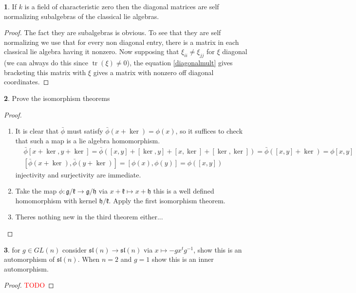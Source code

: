 \documentclass[10.5pt]{article}
\theoremstyle{definition}
\newtheorem{pb}{}
\numberwithin{example}{subsection}
\numberwithin{proposition}{subsection}
\numberwithin{pb}{subsection}
\begin{document}
        \begin{pb}
            If \(k\) is a field of characteristic zero then the diagonal matrices are self normalizing subalgebras of the classical lie algebras.

            \begin{proof}
                The fact they are subalgebras is obvious. To see that they are self normalizing we use that for every non diagonal entry, there is a matrix in each classical lie algebra having it nonzero. Now supposing that \(\xi_{ii} \neq \xi_{jj}\) for \(\xi\) diagonal (we can always do this since \(\operatorname{tr}(\xi) \neq 0\)), the equation \eqref{diagonalmult} gives bracketing this matrix with \(\xi\) gives a matrix with nonzero off diagonal coordinates.
            \end{proof}
        \end{pb}
        \begin{pb}
            Prove the isomorphism theorems
            \begin{proof}
                \begin{enumerate}
                    \item It is clear that \(\bar{\phi}\) must satisfy \(\bar{\phi}(x + \ker) = \phi(x)\), so it suffices to check that such a map is a lie algebra homomorphism.
                    \begin{align}
                        &\bar{\phi}[x+\ker,y+\ker] = \bar{\phi}([x,y] + [\ker,y] + [x,\ker] + [\ker,\ker]) = \bar{\phi}([x,y] + \ker) = \phi[x,y] \\
                        &[\bar{\phi}(x + \ker),\bar{\phi}(y + \ker)] = [\phi(x),\phi(y)] = \phi([x,y])
                    \end{align}
                    injectivity and surjectivity are immediate.

                    \item Take the map \(\phi: \mathfrak{g}/\mathfrak{k} \to \mathfrak{g}/\mathfrak{h}\) via \(x + \mathfrak{k} \mapsto x + \mathfrak{h}\) this is a well defined homomorphism with kernel \(\mathfrak{h}/\mathfrak{k}\). Apply the first isomorphism theorem.
                    \item Theres nothing new in the third theorem either...
                \end{enumerate}
            \end{proof}
        \end{pb}
        \begin{pb}
            for \(g \in GL(n)\) consider \(\mathfrak{sl}(n) \to \mathfrak{sl}(n)\) via \(x \mapsto -gx^tg^{-1}\), show this is an automorphism of \(\mathfrak{sl}(n)\). When \(n=2\) and \(g = 1\) show this is an inner automorphism.

            \begin{proof}
                \textcolor{red}{TODO}
            \end{proof}
        \end{pb}
\end{document}
